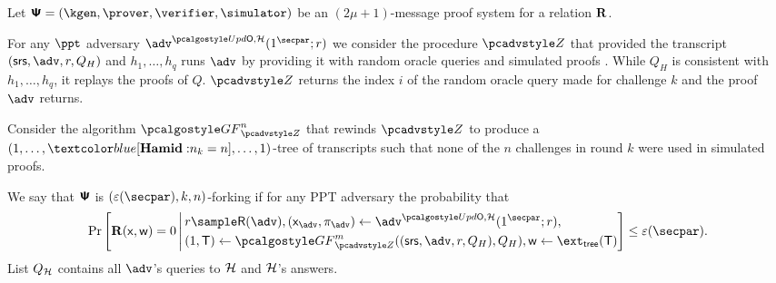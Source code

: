 \begin{definition}
	Let $\proofsystem = (\kgen, \prover, \verifier, \simulator)$ be an
	$(2 \mu + 1)$-message proof system for a relation $\mathbf{R}$.
	
	For any $\ppt$ adversary $\advse^{\initU,
		\ro} (1^\secpar; r)$  we consider the procedure $\zdv$ that provided the transcript $(\srs, \adv, r, Q_H)$ and $h_1, \ldots, h_q$ runs $\adv$ by providing it with random oracle queries
	and simulated proofs . While $Q_{H}$ is consistent with $h_1, \ldots, h_q$, it replays the proofs of $Q$.
	$\zdv$ returns the index $i$ of the
	random oracle query made for challenge $k$ and the proof $\adv$ returns.
	
	Consider the algorithm $\genforking_{\zdv}^{n}$
	that rewinds $\zdv$ to produce a $(1,\dots, \hamid{n_k=n},\dots, 1)$-tree of
	transcripts such that none of the $n$ challenges in round $k$ were used in
	simulated proofs.
	
	We say that $\bm{\mathsf{\Psi}}$ is $(\eps(\secpar), k,n)$-forking if
	for any PPT adversary the probability that
	\begin{align*}
	\Pr\left[
	\REL(\inp, \wit) = 0
	\,\Biggl|\,
	\begin{aligned}
	& r \sample \RND{\advse},
	(\inp_{\advse}, \zkproof_{\advse}) \gets \advse^{\initU, \ro} (1^\secpar; r), \\
	&    (1, \tree) \gets \genforking_{\zdv}^{m}((\srs,\adv,r, Q_{H}),Q_{H}),
	\wit \gets \extt(\tree)
	\end{aligned}
	\right] \leq \eps(\secpar).
	\end{align*}
	List $Q_{\mathcal{H}}$ contains all $\advse$'s
	queries to $\mathcal{H}$ and $\mathcal{H}$'s answers. 
\end{definition}


